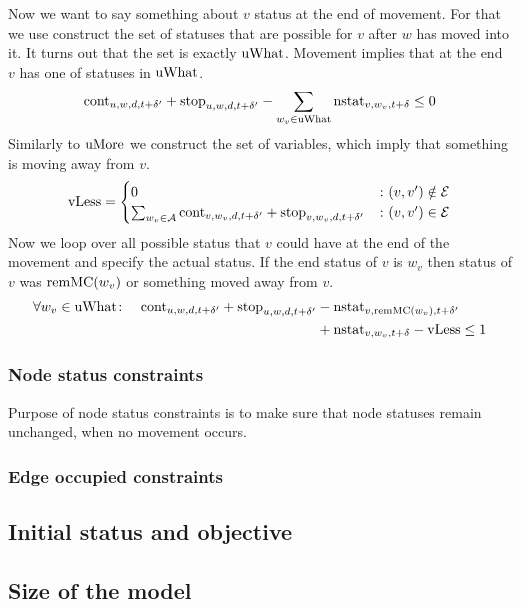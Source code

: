 Now we want to say something about $v$ status at the end of movement. For that
we use construct the set of statuses that are possible for $v$ after $w$ has
moved into it. It turns out that the set is exactly $\mathrm{uWhat}$. Movement implies
that at the end $v$ has one of statuses in $\mathrm{uWhat}$.
\begin{align}
    \begin{split}
        \mathrm{cont}_{u,w,d,t+\delta'} + \mathrm{stop}_{u,w,d,t+\delta'} -\sum_{w_v \in \mathrm{uWhat}}
        \mathrm{nstat}_{v,w_v,t+\delta} \leq 0
    \end{split}
\end{align}
Similarly to $\mathrm{uMore}$ we construct the set of variables, which imply that something is
moving away from $v$.
\begin{align}
    \mathrm{vLess} = \begin{cases}
        0 &\colon (v,v') \notin \mathcal{E}\\
        \sum_{w_v \in \mathcal{A}} \mathrm{cont}_{v,w_v,d,t+\delta'} +
        \mathrm{stop}_{v,w_v,d,t+\delta'} &\colon (v,v') \in \mathcal{E}
    \end{cases}
\end{align}
Now we loop over all possible status that $v$ could have at the end of the
movement and specify the actual status. If the end status of $v$ is $w_v$ then
status of $v$ was $\mathrm{remMC}(w_v)$ or something moved away from $v$.
\begin{align}
    \begin{split}
        \forall w_v \in \mathrm{uWhat}\colon \quad
        \mathrm{cont}_{u,w,d,t+\delta'} + \mathrm{stop}_{u,w,d,t+\delta'}
        &-\mathrm{nstat}_{v,\mathrm{remMC}(w_v),t+\delta'}\\
        &+\mathrm{nstat}_{v,w_v,t+\delta} -\mathrm{vLess} \leq 1
    \end{split}
\end{align}
\subsubsection{Node status constraints}
Purpose of node status constraints is to make sure that node statuses remain
unchanged, when no movement occurs.
\subsubsection{Edge occupied constraints}
\subsection{Initial status and objective}
\subsection{Size of the model}
